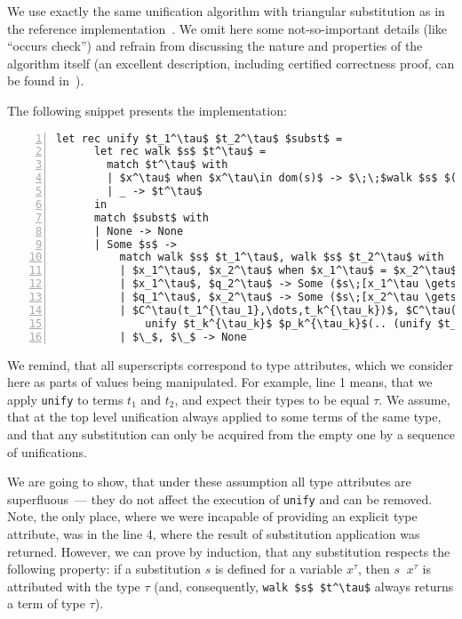 We use exactly the same unification algorithm with triangular substitution as in the reference implementation~\cite{MicroKanren}. We
omit here some not-so-important details (like ``occurs check'') and refrain from discussing the nature and properties of the algorithm
itself (an excellent description, including certified correctness proof, can be found in~\cite{Kumar}).

The following snippet presents the implementation:

\begin{lstlisting}[mathescape=true,numbers=left,numberstyle=\small,stepnumber=1,numbersep=-5pt]
    let rec unify $t_1^\tau$ $t_2^\tau$ $subst$ = 
      let rec walk $s$ $t^\tau$ = 
        match $t^\tau$ with
        | $x^\tau$ when $x^\tau\in dom(s)$ -> $\;\;$walk $s$ $(s\;\;x^\tau)$
        | _ -> $t^\tau$
      in
      match $subst$ with
      | None -> None
      | Some $s$ ->
          match walk $s$ $t_1^\tau$, walk $s$ $t_2^\tau$ with
          | $x_1^\tau$, $x_2^\tau$ when $x_1^\tau$ = $x_2^\tau$ -> $subst$
          | $x_1^\tau$, $q_2^\tau$ -> Some ($s\;[x_1^\tau \gets q_2^\tau]$)
          | $q_1^\tau$, $x_2^\tau$ -> Some ($s\;[x_2^\tau \gets q_1^\tau]$)
          | $C^\tau(t_1^{\tau_1},\dots,t_k^{\tau_k})$, $C^\tau(p_1^{\tau_1},\dots,p_k^{\tau_k})$ -> 
              unify $t_k^{\tau_k}$ $p_k^{\tau_k}$(.. (unify $t_1^{\tau_1}$ $p_1^{\tau_1}$ $subst$)$..$)
          | $\_$, $\_$ -> None
\end{lstlisting}

We remind, that all superscripts correspond to type attributes, which we consider here as 
parts of values being manipulated. For example, line 1 means, that we apply \lstinline{unify}
to terms $t_1$ and $t_2$, and expect their types to be equal $\tau$. We assume, that 
at the top level unification always applied to some terms of the same type, and that any
substitution can only be acquired from the empty one by a sequence of unifications.

We are going to show, that under these assumption all type attributes are superfluous~--- they
do not affect the execution of \lstinline{unify} and can be removed. Note, the only place, where we
were incapable of providing an explicit type attribute, was in the line 4, where the result of
substitution application was returned. However, we can prove by induction, that any substitution 
respects the following property: if a substitution $s$ is defined for a variable $x^\tau$,
then $s\;\;x^\tau$ is attributed with the type $\tau$ (and, consequently, \lstinline{walk $s$ $t^\tau$} always
returns a term of type $\tau$).

